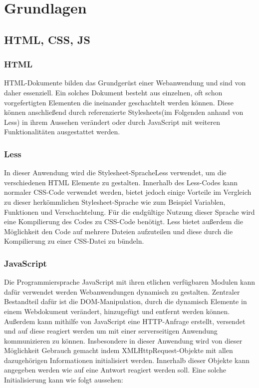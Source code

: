 \chapter{Grundlagen}

\section{HTML, CSS, JS}
\subsection{HTML}
HTML-Dokumente bilden das Grundgerüst einer Webanwendung und sind von daher essenziell. Ein solches Dokument besteht aus einzelnen, oft schon vorgefertigten Elementen die ineinander geschachtelt werden können. Diese können anschließend durch referenzierte \glqq Stylesheets\grqq \thinspace(im Folgenden anhand von Less) in ihrem Aussehen verändert oder durch JavaScript mit weiteren Funktionalitäten ausgestattet werden.

\subsection{Less}
In dieser Anwendung wird die \glqq Stylesheet-Sprache\grqq \thinspace Less verwendet, um die verschiedenen HTML Elemente zu gestalten. Innerhalb des Less-Codes kann normaler CSS-Code verwendet werden, bietet jedoch einige Vorteile im Vergleich zu dieser herkömmlichen Stylesheet-Sprache wie zum Beispiel Variablen, Funktionen und Verschachtelung. Für die endgültige Nutzung dieser Sprache wird eine Kompilierung des Codes zu CSS-Code benötigt. Less bietet außerdem die Möglichkeit den Code auf mehrere Dateien aufzuteilen und diese durch die Kompilierung zu einer CSS-Datei zu bündeln.

\subsection{JavaScript}
Die Programmiersprache JavaScript mit ihren etlichen verfügbaren Modulen kann dafür verwendet werden Webanwendungen dynamisch zu gestalten. Zentraler Bestandteil dafür ist die \glqq DOM-Manipulation\grqq , durch die dynamisch Elemente in einem Webdokument verändert, hinzugefügt und entfernt werden können. Außerdem kann mithilfe von JavaScript eine HTTP-Anfrage erstellt, versendet und auf diese reagiert werden um mit einer serverseitigen Anwendung kommunizieren zu können. Insbesondere in dieser Anwendung wird von dieser Möglichkeit Gebrauch gemacht indem \glqq XMLHttpRequest\grqq-Objekte mit allen dazugehörigen Informationen initialisiert werden. Innerhalb dieser Objekte kann angegeben werden wie auf eine Antwort reagiert werden soll. Eine solche Initialisierung kann wie folgt aussehen:

